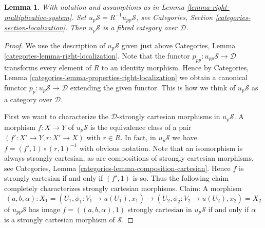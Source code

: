 \documentclass{stacks-project}
\theoremstyle{plain}
\newtheorem{lemma}[subsection]{Lemma}
\theoremstyle{definition}
\theoremstyle{remark}
\numberwithin{equation}{subsection}
\begin{document}
\begin{lemma}
\label{lemma-fibred-category-pullback}
With notation and assumptions as in
Lemma \ref{lemma-right-multiplicative-system}.
Set $u_p\mathcal{S} = R^{-1}u_{pp}\mathcal{S}$, see
Categories, Section \ref{categories-section-localization}.
Then $u_p\mathcal{S}$ is a fibred category over $\mathcal{D}$.
\end{lemma}

\begin{proof}
We use the description of $u_p\mathcal{S}$ given just above
Categories, Lemma \ref{categories-lemma-right-localization}.
Note that the functor $p_{pp} : u_{pp}\mathcal{S} \to \mathcal{D}$
transforms every element of $R$ to an identity morphism.
Hence by
Categories, Lemma \ref{categories-lemma-properties-right-localization}
we obtain a canonical functor $p_p : u_p\mathcal{S} \to \mathcal{D}$
extending the given functor. This is how we think of
$u_p\mathcal{S}$ as a category over $\mathcal{D}$.

\medskip\noindent
First we want to characterize the $\mathcal{D}$-strongly cartesian morphisms
in $u_p\mathcal{S}$.
A morphism $f : X \to Y$ of $u_p\mathcal{S}$ is the equivalence class of
a pair $(f' : X' \to Y, r : X' \to X)$ with $r \in R$.
In fact, in $u_p\mathcal{S}$ we have $f = (f', 1) \circ (r, 1)^{-1}$
with obvious notation.
Note that an isomorphism is always strongly cartesian, as are
compositions of strongly cartesian morphisms, see
Categories, Lemma \ref{categories-lemma-composition-cartesian}.
Hence $f$ is strongly cartesian if and only if $(f', 1)$ is so.
Thus the following claim completely characterizes strongly cartesian
morphisms. Claim: A morphism
$$
(a, b, \alpha) :
X_1 = (U_1, \phi_1 : V_1 \to u(U_1), x_1)
\longrightarrow
(U_2, \phi_2 : V_2 \to u(U_2), x_2) = X_2
$$
of $u_{pp}\mathcal{S}$ has image $f = ((a, b, \alpha), 1)$
strongly cartesian in $u_p\mathcal{S}$ if and only if $\alpha$
is a strongly cartesian morphism of $\mathcal{S}$.


\end{proof}
\end{document}
